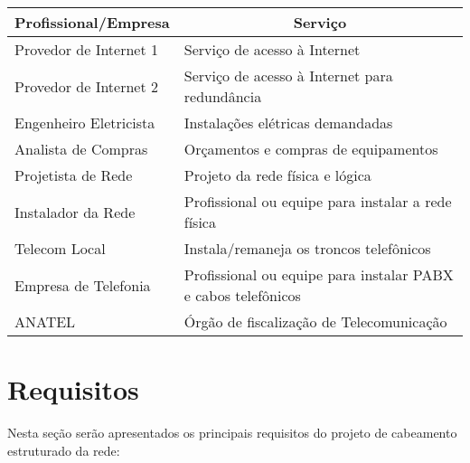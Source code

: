 \documentclass[	DIV=calc,%
							paper=a4,%
							fontsize=12pt,%
							onecolumn]{scrartcl}	 					%
\begin{document}
\begin{table}[]
	\begin{tabular}{|l|l|}
		\hline
		\multicolumn{1}{|c|}{\textbf{Profissional/Empresa}} & \multicolumn{1}{c|}{\textbf{Serviço}}                         \\ \hline
		Provedor de Internet 1                              & Serviço de acesso à Internet                                  \\ \hline
		Provedor de Internet 2                              & Serviço de acesso à Internet para redundância                 \\ \hline
		Engenheiro Eletricista                              & Instalações elétricas demandadas                              \\ \hline
		Analista de Compras                                 & Orçamentos e compras de equipamentos                          \\ \hline
		Projetista de Rede                                  & Projeto da rede física e lógica                               \\ \hline
		Instalador da Rede                                  & Profissional ou equipe para instalar a rede física            \\ \hline
		Telecom Local                                       & Instala/remaneja os troncos telefônicos                       \\ \hline
		Empresa de Telefonia                                & Profissional ou equipe para instalar PABX e cabos telefônicos \\ \hline
		ANATEL                                              & Órgão de fiscalização de Telecomunicação                      \\ \hline
	\end{tabular}
\end{table}


\section{Requisitos}

Nesta seção serão apresentados os principais requisitos do projeto de cabeamento estruturado da rede:	
\end{document}
